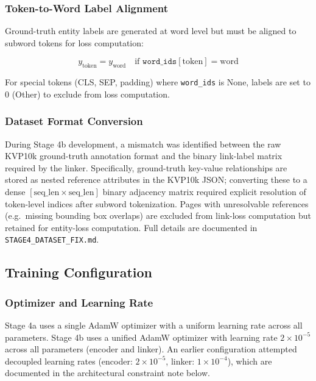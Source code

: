 \subsubsection{Token-to-Word Label Alignment}

Ground-truth entity labels are generated at word level but must be aligned to subword tokens for loss computation:

\[
y_{\text{token}} = y_{\text{word}} \quad \text{if } \texttt{word\_ids}[\text{token}] = \text{word}
\]

For special tokens (CLS, SEP, padding) where \texttt{word\_ids} is None, labels are set to 0 (Other) to exclude from loss computation.

\subsubsection{Dataset Format Conversion}
\label{sec:dataset_format_fix}

During Stage 4b development, a mismatch was identified between the raw KVP10k ground-truth annotation format and the binary link-label matrix required by the linker. Specifically, ground-truth key-value relationships are stored as nested reference attributes in the KVP10k JSON; converting these to a dense $[\text{seq\_len} \times \text{seq\_len}]$ binary adjacency matrix required explicit resolution of token-level indices after subword tokenization. Pages with unresolvable references (e.g.\ missing bounding box overlaps) are excluded from link-loss computation but retained for entity-loss computation. Full details are documented in \texttt{STAGE4\_DATASET\_FIX.md}.

\subsection{Training Configuration}
\label{sec:stage4_training_config}

\subsubsection{Optimizer and Learning Rate}
\label{sec:stage4_lr}

Stage 4a uses a single AdamW optimizer with a uniform learning rate across all parameters. Stage 4b uses a unified AdamW optimizer with learning rate $2 \times 10^{-5}$ across all parameters (encoder and linker). An earlier configuration attempted decoupled learning rates (encoder: $2 \times 10^{-5}$, linker: $1 \times 10^{-4}$), which are documented in the architectural constraint note below.

